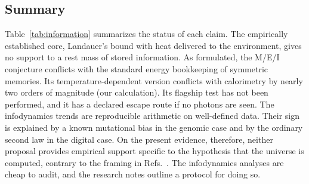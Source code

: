 \subsection{Summary}
\label{sec:information:summary}

Table~\ref{tab:information} summarizes the status of each claim. The empirically established core,
Landauer's bound with heat delivered to the environment, gives no support to a rest mass of stored
information. As formulated, the M/E/I conjecture conflicts with the standard energy bookkeeping of
symmetric memories. Its temperature-dependent version conflicts with calorimetry by nearly two
orders of magnitude (our calculation). Its flagship test has not been performed, and it has a declared escape route if no
photons are seen. The infodynamics trends are reproducible arithmetic on well-defined data. Their
sign is explained by a known mutational bias in the genomic case and by the ordinary second law in
the digital case. On the present evidence, therefore, neither proposal provides empirical support specific to the
hypothesis that the universe is computed, contrary to the framing in
Refs.~\cite{Vopson2023second,Vopson2025is}. The infodynamics analyses are cheap to audit, and the
research notes outline a protocol for doing so.

